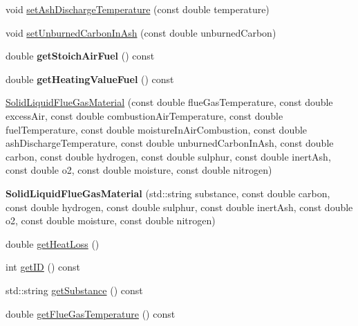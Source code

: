 \begin{DoxyCompactItemize}
void \hyperlink{class_solid_liquid_flue_gas_material_ad29543a88737c3d051c7d824287bc791}{set\+Ash\+Discharge\+Temperature} (const double temperature)
\item 
void \hyperlink{class_solid_liquid_flue_gas_material_adf052dd1bdceeab710a4986b1fd874b9}{set\+Unburned\+Carbon\+In\+Ash} (const double unburned\+Carbon)
\item 
\mbox{\label{class_solid_liquid_flue_gas_material_a0fc7264baa34c702ffbb79cfb0ec9f59}} 
double {\bfseries get\+Stoich\+Air\+Fuel} () const
\item 
\mbox{\label{class_solid_liquid_flue_gas_material_af9742946465fb1a27533ead1c0174193}} 
double {\bfseries get\+Heating\+Value\+Fuel} () const
\item 
\hyperlink{class_solid_liquid_flue_gas_material_a91e7c5e670b3db4fedcbc494448644d5}{Solid\+Liquid\+Flue\+Gas\+Material} (const double flue\+Gas\+Temperature, const double excess\+Air, const double combustion\+Air\+Temperature, const double fuel\+Temperature, const double moisture\+In\+Air\+Combustion, const double ash\+Discharge\+Temperature, const double unburned\+Carbon\+In\+Ash, const double carbon, const double hydrogen, const double sulphur, const double inert\+Ash, const double o2, const double moisture, const double nitrogen)
\item 
\mbox{\label{class_solid_liquid_flue_gas_material_a20ad2bd800e215fdaa1c534355cc803b}} 
{\bfseries Solid\+Liquid\+Flue\+Gas\+Material} (std\+::string substance, const double carbon, const double hydrogen, const double sulphur, const double inert\+Ash, const double o2, const double moisture, const double nitrogen)
\item 
double \hyperlink{class_solid_liquid_flue_gas_material_af7d36673e49f9b5eb631fc04227883d6}{get\+Heat\+Loss} ()
\item 
int \hyperlink{class_solid_liquid_flue_gas_material_afb124b546137da7ba99e31616198e0c8}{get\+ID} () const
\item 
std\+::string \hyperlink{class_solid_liquid_flue_gas_material_a6e07a23fb05c15c7e5dba39334988de8}{get\+Substance} () const
\item 
double \hyperlink{class_solid_liquid_flue_gas_material_aba4604158b3c624496d7de4b5fb511e2}{get\+Flue\+Gas\+Temperature} () const
\item 

\end{DoxyCompactItemize}
